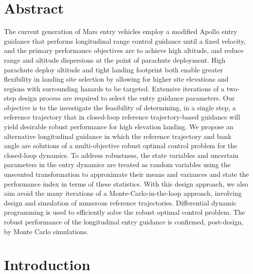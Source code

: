 \documentclass[journal ]{new-aiaa}
\begin{document}
\section*{Abstract}
The current generation of Mars entry vehicles employ a modified Apollo entry guidance that performs longitudinal range control guidance until a fixed velocity, and the primary performance objectives are to achieve high altitude, and reduce range and altitude dispersions at the point of parachute deployment. High parachute deploy altitude and tight landing footprint both enable greater flexibility in landing site selection by allowing for higher site elevations and regions with surrounding hazards to be targeted. Extensive iterations of a two-step design process are required to select the entry guidance parameters.
Our objective is to the investigate the feasibility of determining, in a single step, a reference trajectory that in closed-loop reference trajectory-based guidance will yield desirable robust performance for high elevation landing. 
We propose an alternative longitudinal guidance in which the reference trajectory and bank angle are solutions of a multi-objective robust optimal control problem for the closed-loop dynamics. To address robustness, the state variables and uncertain parameters in the entry dynamics are treated as random variables using the unscented transformation to approximate their means and variances and state the performance index in terms of these statistics. With this design approach, we also aim avoid the many iterations of a Monte-Carlo-in-the-loop approach, involving design and simulation of numerous reference trajectories. Differential dynamic programming is used to efficiently solve the robust optimal control problem. The robust performance of the longitudinal entry guidance is confirmed, post-design, by Monte Carlo simulations. 

\section*{Introduction}

\end{document}
